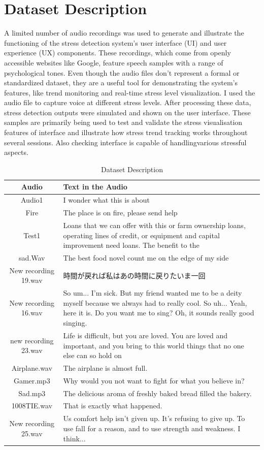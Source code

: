 \documentclass[Arial,12pt,openright,twoside]{book}
\begin{document}
\section{Dataset Description}
  A limited number of audio recordings was used to generate and illustrate the functioning of the stress detection system's user interface (UI) and user experience (UX) components. These recordings, which come from openly accessible websites like Google, feature speech samples with a range of psychological tones. Even though the audio files don't represent a formal or standardized dataset, they are a useful tool for demonstrating the system's features, like trend monitoring and real-time stress level visualization. I used the audio file to capture voice at different stress levels. After processing these data, stress detection outputs were simulated and shown on the user interface. These samples are primarily being used to test and validate the stress visualisation features of interface and illustrate how stress trend tracking works throughout several sessions. Also checking interface is capable of handlingvarious stressful aspects.
\begin{table}[p] %
\centering
\caption{Dataset Description}
\label{tab:dataset_table} %
\begin{tabular}{|c|p{8cm}|} %
\hline
\textbf{Audio} & \textbf{Text in the Audio} \\ \hline
Audio1 & I wonder what this is about \\ \hline
Fire & The place is on fire, please send help \\ \hline
Test1 & Loans that we can offer with this or farm ownership loans, operating lines of credit, or equipment and capital improvement need loans. The benefit to the \\ \hline
sad.Wav & The best food novel count me on the edge of my side \\ \hline
New recording 19.wav & 時間が戻れば私はあの時間に戻りたいま一回 \\ \hline
New recording 16.wav & So um... I'm sick. But my friend wanted me to be a deity myself because we always had to really cool. So uh... Yeah, here it is. Do you want me to sing? Oh, it sounds really good singing. \\ \hline
new recording 23.wav & Life is difficult, but you are loved. You are loved and important, and you bring to this world things that no one else can so hold on \\ \hline
Airplane.wav & The airplane is almost full.\\ \hline
Gamer.mp3 & Why would you not want to fight for what you believe in? \\ \hline
Sad.mp3 & The delicious aroma of freshly baked bread filled the bakery. \\ \hline
1008TIE.wav & That is exactly what happened.\\ \hline
New recording 25.wav & Us comfort help isn't given up. It's refusing to give up. To use fall for a reason, and to use strength and weakness. I think... \\ \hline
\end{tabular}
\end{table}
\end{document}
